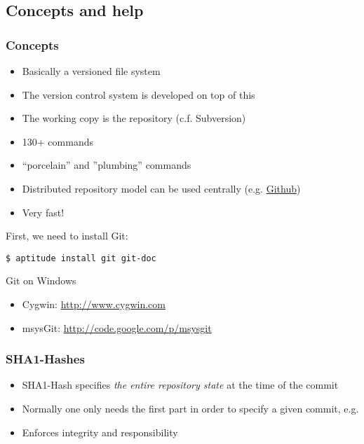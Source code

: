 \subsection{Concepts and help}

\begin{frame}[fragile]
\frametitle{Concepts}
\begin{itemize}
    \item Basically a versioned file system
    \item The version control system is developed on top of this
    \item The working copy is the repository (c.f. Subversion)
    \item 130+ commands
    \item ``porcelain'' and ''plumbing'' commands
    \item Distributed repository model can be used centrally
    (e.g. \href{http://github.com/}{\alert{Github}})
    \item Very fast!
\end{itemize}

First, we need to install Git:
\begin{lstlisting}
$ aptitude install git git-doc
\end{lstlisting}

Git on Windows
\begin{itemize}
    \item Cygwin: \url{http://www.cygwin.com}
    \item msysGit: \url{http://code.google.com/p/msysgit}
\end{itemize}

\end{frame}

\begin{frame}[fragile]
\frametitle{SHA1-Hashes}
\begin{itemize}
    \item SHA1-Hash specifies \emph{the entire repository state} at the time
	of the commit
    \item Normally one only needs the first part in order to specify a given
	commit, e.g. 
    \item Enforces integrity and responsibility
\end{itemize}

\end{frame}

